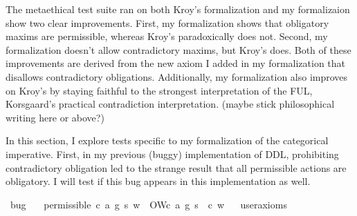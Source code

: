 \begin{isabellebody}
\begin{isamarkuptext}
The metaethical test suite ran on both Kroy's formalization and my formalizaion show two clear 
improvements. First, my formalization shows that obligatory maxims are permissible, whereas Kroy's 
paradoxically does not. Second, my formalization doesn't allow contradictory maxims, but Kroy's does. 
Both of these improvements are derived from the new axiom I added in my formalization that disallows 
contradictory obligations. Additionally, my formalization also improves on Kroy's by staying faithful to the 
strongest interpretation of the FUL, Korsgaard's practical contradiction interpretation. (maybe stick 
philosophical writing here or above?)%
\end{isamarkuptext}\isamarkuptrue%
%
\isadelimdocument
%
\endisadelimdocument
%
\isatagdocument
%
\isamarkuptrue%
%
\endisatagdocument
{\isafolddocument}%
%
\isadelimdocument
%
\endisadelimdocument
%
\begin{isamarkuptext}%
In this section, I explore tests specific to my formalization of the categorical imperative. First, 
in my previous (buggy) implementation of DDL, prohibiting contradictory obligation led to the strange 
result that all permissible actions are obligatory. I will test if this bug appears in this implementation 
as well.%
\end{isamarkuptext}\isamarkuptrue%
\isamarkupfalse%
\ bug{\isacharcolon}\isanewline
\ \ \ {\isachardoublequoteopen}permissible\ {\isacharparenleft}c{\isacharcomma}\ a{\isacharcomma}\ g{\isacharparenright}\ s\ w\ {\isasymlongrightarrow}\ O{\isacharbraceleft}W{\isacharparenleft}c{\isacharcomma}\ a{\isacharcomma}\ g{\isacharparenright}\ s\ {\isacharbar}\ c{\isacharbraceright}\ w{\isachardoublequoteclose}\isanewline
\ \ \isamarkupfalse%
{\isacharbrackleft}user{\isacharunderscore}axioms{\isacharbrackright}%
\isadelimproof
\ %
\endisadelimproof
%
\isatagproof
{}\isamarkupfalse%
\isanewline
%
\isanewline
%
\endisatagproof
{\isafoldproof}%
%
\isadelimproof
%
\endisadelimproof
%
\isadelimtheory
%
\endisadelimtheory
%
\isatagtheory
%
\endisatagtheory
{\isafoldtheory}%
%
\isadelimtheory
%
\endisadelimtheory
%
\end{isabellebody}%
